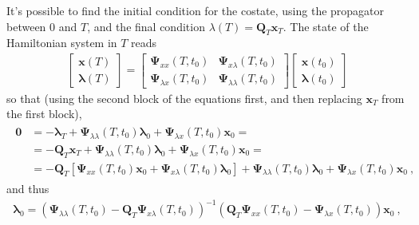\documentclass[letterpaper,10pt,english]{jupyterBook}
\begin{document}
\sphinxAtStartPar
{} It’s possible to find the initial condition for the co\sphinxhyphen{}state, using the propagator between \(0\) and \(T\), and the final condition \(\lambda(T) = \mathbf{Q}_T \mathbf{x}_T\). The state of the Hamiltonian system in \(T\) reads
\begin{equation*}
\begin{split}\begin{bmatrix} \mathbf{x}(T) \\ \boldsymbol\lambda(T)  \end{bmatrix} = \begin{bmatrix} \boldsymbol\Psi_{xx}(T,t_0) & \boldsymbol\Psi_{x\lambda}(T,t_0) \\ \boldsymbol\Psi_{\lambda x}(T,t_0) & \boldsymbol\Psi_{\lambda \lambda}(T,t_0) \end{bmatrix} \begin{bmatrix} \mathbf{x}(t_0) \\ \boldsymbol\lambda(t_0) \end{bmatrix}\end{split}
\end{equation*}
\sphinxAtStartPar
so that (using the second block of the equations first, and then replacing \(\mathbf{x}_T\) from the first block),
\begin{equation*}
\begin{split}\begin{aligned}
  \mathbf{0}
  & = - \boldsymbol\lambda_T + \boldsymbol\Psi_{\lambda \lambda}(T,t_0) \boldsymbol\lambda_0 + \boldsymbol\Psi_{\lambda x}(T,t_0) \mathbf{x}_0  = \\
  & = - \mathbf{Q}_T \mathbf{x}_T + \boldsymbol\Psi_{\lambda \lambda}(T,t_0) \boldsymbol\lambda_0 + \boldsymbol\Psi_{\lambda x}(T,t_0) \mathbf{x}_0  = \\
  & = - \mathbf{Q}_T \left[ \boldsymbol\Psi_{xx}(T,t_0) \mathbf{x}_0+\boldsymbol\Psi_{x\lambda}(T,t_0) \boldsymbol\lambda_0 \right] + \boldsymbol\Psi_{\lambda \lambda}(T,t_0) \boldsymbol\lambda_0 + \boldsymbol\Psi_{\lambda x}(T,t_0) \mathbf{x}_0  \ ,
\end{aligned}\end{split}
\end{equation*}
\sphinxAtStartPar
and thus
\begin{equation*}
\begin{split}\boldsymbol\lambda_0 = \left(\boldsymbol\Psi_{\lambda \lambda}(T,t_0) - \mathbf{Q}_T \boldsymbol\Psi_{x\lambda}(T,t_0) \right)^{-1} \left( \mathbf{Q}_T \boldsymbol\Psi_{xx}(T,t_0) - \boldsymbol\Psi_{\lambda x}(T,t_0) \right) \mathbf{x}_0 \ ,\end{split}
\end{equation*}
\end{document}

